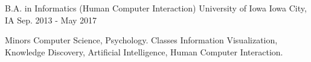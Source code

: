 \begin{cventries}
  \cventry
    {B.A. in Informatics (Human Computer Interaction)}
    {University of Iowa}
    {Iowa City, IA}
    {Sep. 2013 - May 2017}
    {
      \begin{cvitems}
        \begin{cvskills}
          \cvskill
            {Minors}
            {Computer Science, Psychology.}
          \cvskill
            {Classes}
            {Information Visualization, Knowledge Discovery, Artificial Intelligence, Human Computer Interaction.}
        \end{cvskills}
      \end{cvitems}
    }
\end{cventries}
